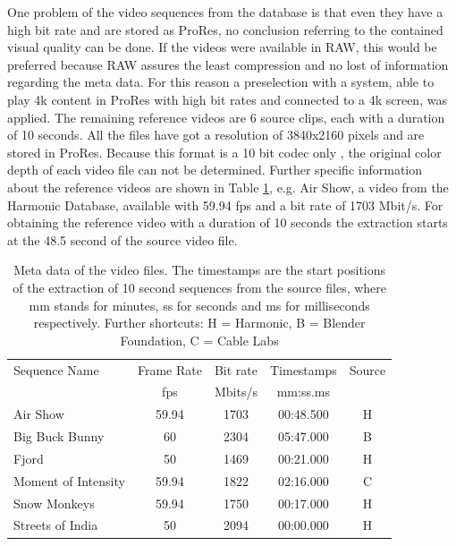 One problem of the video sequences from the database is that even they have a high bit rate and are stored as ProRes, no conclusion referring to the contained visual quality can be done. If the videos were available in RAW, this would be preferred because RAW assures the least compression and no lost of information regarding the meta data.
For this reason a preselection with a system, able to play 4k content in ProRes with high bit rates and connected to a 4k screen, was applied.
The remaining reference videos are 6 source clips, each with a duration of 10 seconds. All the files have got a resolution of 3840x2160 pixels and are stored in ProRes. Because this format is a 10 bit codec only \cite{web:ProRes}, the original color depth of each video file can not be determined.
Further specific information about the reference videos are shown in Table \ref{tab:Specifications}, e.g. Air Show, a video from the Harmonic Database, available with 59.94 fps and a bit rate of 1703 Mbit/s. For obtaining the reference video with a duration of 10 seconds the extraction starts at the 48.5 second of the source video file.

\begin{table}[hbt!]
	\renewcommand{\arraystretch}{1.3}
	\centering
	\caption{Meta data of the video files. The timestamps are the start positions of the extraction of 10 second sequences from the source files, where mm stands for minutes, ss for seconds and ms for milliseconds respectively. Further shortcuts: H = Harmonic, B = Blender Foundation, C = Cable Labs}
	\label{tab:Specifications}
	\begin{tabular}{lcccc}
		\toprule
		Sequence Name       & Frame Rate & Bit rate & Timestamps & Source\\
		& fps  	   & Mbits/s    & mm:ss.ms   & \\
		\midrule
		Air Show            & 59.94    & 1703 & 00:48.500  &   H  \\
		Big Buck Bunny      & 60       & 2304 & 05:47.000  &   B  \\
		Fjord               & 50       & 1469 & 00:21.000  &   H  \\
		Moment of Intensity & 59.94    & 1822 & 02:16.000  &   C \\
		Snow Monkeys        & 59.94    & 1750 & 00:17.000  &   H  \\
		Streets of India    & 50       & 2094 & 00:00.000  &   H  \\
		\bottomrule
	\end{tabular}
\end{table}

